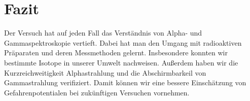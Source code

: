 

\chapter{Fazit}
\label{chap:fazit}
Der Versuch hat auf jeden Fall das Verständnis von Alpha- und Gammaspektroskopie vertieft. Dabei hat man den Umgang mit radioaktiven 
Präparaten und deren Messmethoden gelernt. Insbesondere konnten wir bestimmte Isotope in unserer Umwelt nachweisen. Außerdem haben wir die Kurzreichweitigkeit
Alphastrahlung und die Abschirmbarkeil von Gammastrahlung verifiziert. Damit können wir eine bessere Einschätzung von Gefahrenpotentialen 
bei zukünftigen Versuchen vornehmen. 

